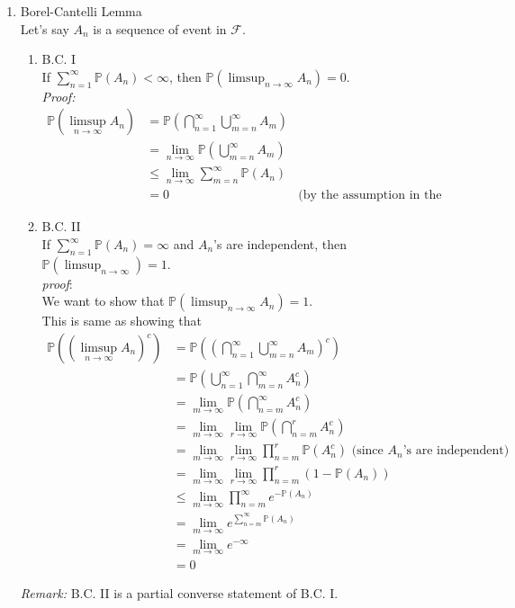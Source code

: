 \documentclass[11pt]{article}
\begin{document}
\begin{enumerate}
\begin{enumerate}
\end{enumerate}
\item{Borel-Cantelli Lemma}\\
Let's say $A_n$ is a sequence of event in $\mathcal{F}$.
\begin{enumerate}
\item{B.C. I}\\ 
If $\sum_{n=1}^{\infty}\mathbb{P}(A_n) < \infty$,  then $\mathbb{P}(\limsup_{n \to \infty} A_n) = 0$.\\
\textit{Proof:} \begin{align*}
\mathbb{P}(\limsup_{n \to \infty} A_n) &= \mathbb{P}(\bigcap_{n=1}^{\infty} \bigcup_{m=n}^{\infty}A_m)\\
&= \lim_{n \to \infty} \mathbb{P}(\bigcup_{m=n}^{\infty}A_m)\\
&\leq \lim_{n \to \infty} \sum_{m=n}^{\infty} \mathbb{P}(A_n)\\
&=0 &\text{(by the assumption in the if statement)}
\end{align*}
\item{B.C. II}\\
If $\sum_{n=1}^{\infty}\mathbb{P}(A_n) = \infty$ and $A_n$'s are independent, then $\mathbb{P}(\limsup_{n \to \infty}) = 1$.\\
\textit{proof}: \\
We want to show that $\mathbb{P}(\limsup_{n \to \infty} A_n) = 1$.\\This is same as showing that 
\begin{align*}
\mathbb{P}((\limsup_{n \to \infty} A_n)^{c}) &= \mathbb{P}((\bigcap_{n=1}^{\infty} \bigcup_{m=n}^{\infty}A_m)^{c})\\
&= \mathbb{P}(\bigcup_{n=1}^{\infty}\bigcap_{m=n}^{\infty} A_n ^c)\\
&= \lim_{m \to \infty} \mathbb{P}(\bigcap_{n=m}^{\infty} A_n ^c)\\
&= \lim_{m \to \infty} \lim_{r \to \infty} \mathbb{P} (\bigcap_{n=m}^{r} A_n ^c)\\
&= \lim_{m \to \infty} \lim_{r \to \infty} \prod_{n=m}^{r} \mathbb{P} (A_n ^c) \text{ (since $A_n$'s are independent)}\\
&= \lim_{m \to \infty} \lim_{r \to \infty} \prod_{n=m}^{r} (1-\mathbb{P} (A_n))\\
&\leq \lim_{m \to \infty} \prod_{n=m}^{\infty} e^{-\mathbb{P} (A_n)}\\
&= \lim_{m \to \infty} e^{\sum_{n=m}^{\infty} \mathbb{P}(A_n)}\\
&= \lim_{m \to \infty} e^{-\infty}\\
&= 0
\end{align*}
\end{enumerate}
\textit{Remark:} B.C. II is a partial converse statement of B.C. I.


\end{enumerate}
\end{document}
